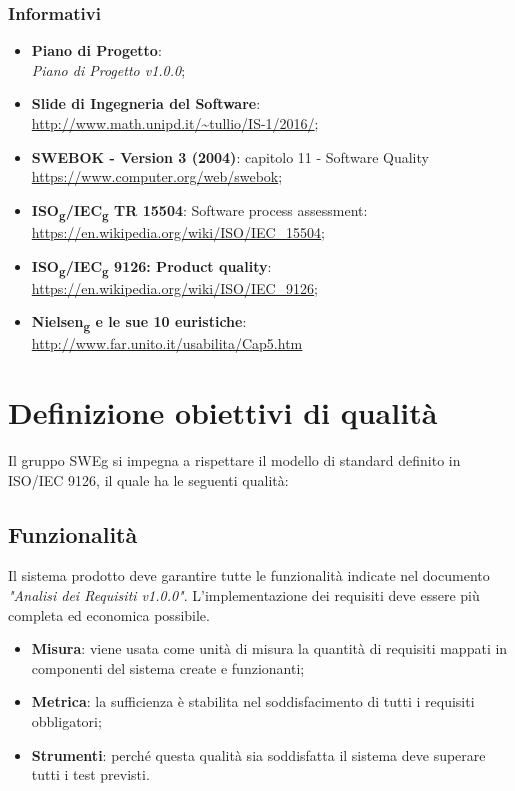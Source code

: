 \documentclass[12pt,a4paper,titlepage]{article}
\begin{document}
	\subsubsection{Informativi}
	\begin{itemize}
		\item \textbf{Piano di Progetto}:\\
		\textit{Piano di Progetto v1.0.0};
		\item \textbf{Slide di Ingegneria del Software}:\\ 
			\textcolor{blue}{\url{http://www.math.unipd.it/~tullio/IS-1/2016/}};
		\item \textbf{SWEBOK - Version 3 (2004)}: capitolo 11 - Software Quality\\
			\textcolor{blue}{\url{https://www.computer.org/web/swebok}};
		\item \textbf{ISO\textsubscript{g}/IEC\textsubscript{g} TR 15504}: Software process assessment:\\
			\textcolor{blue}{\url{https://en.wikipedia.org/wiki/ISO/IEC_15504}};
		\item \textbf{ISO\textsubscript{g}/IEC\textsubscript{g} 9126: Product quality}:\\
			\textcolor{blue}{\url{https://en.wikipedia.org/wiki/ISO/IEC_9126}};
		\item \textbf{Nielsen\textsubscript{g} e le sue 10 euristiche}: \\
			\textcolor{blue}{\url{http://www.far.unito.it/usabilita/Cap5.htm}}
	\end{itemize} 
	
	\newpage
	\section{Definizione obiettivi di qualità}
	Il gruppo SWEg si impegna a rispettare il modello di standard definito in ISO/IEC 9126, il quale ha le seguenti qualità:
		\subsection{Funzionalità}
		Il sistema prodotto deve garantire tutte le funzionalità indicate nel documento \textit{"Analisi dei Requisiti v1.0.0"}. L'implementazione dei requisiti deve essere più completa ed economica possibile.
		\begin{itemize}
			\item \textbf{Misura}: viene usata come unità di misura la quantità di requisiti mappati in componenti del sistema create e funzionanti;
			\item \textbf{Metrica}: la sufficienza è stabilita nel soddisfacimento di tutti i requisiti obbligatori;
			\item \textbf{Strumenti}: perché questa qualità sia soddisfatta il sistema deve superare tutti i test previsti.
		\end{itemize}
	
\end{document}
